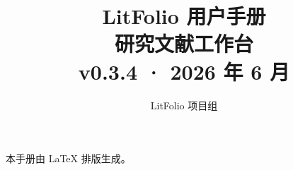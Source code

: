 \documentclass[UTF8,11pt,a4paper,oneside]{ctexbook}
\title{%
  {\fontsize{32}{38}\selectfont\bfseries\color{ink} LitFolio 用户手册}\\[1.2em]
  {\Large\color{violet} 研究文献工作台}\\[0.6em]
  {\large\color{muted} v0.3.4 · 2026 年 6 月}%
}
\author{LitFolio 项目组}
\date{}
\begin{document}
\frontmatter
\thispagestyle{empty}
\vspace*{4cm}
\begin{center}
\maketitle
\end{center}
\vfill
\begin{center}\small\color{muted}
  本手册由 \LaTeX{} 排版生成。
\end{center}
\clearpage

\tableofcontents



\mainmatter




\backmatter
\end{document}
